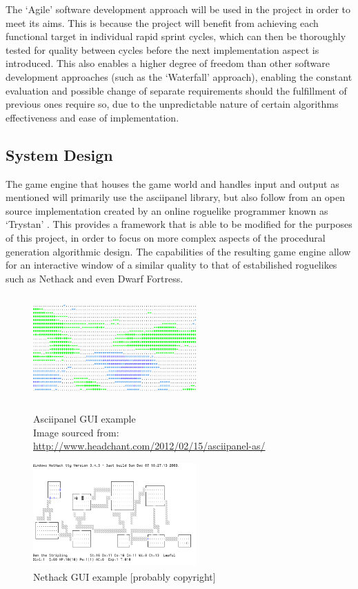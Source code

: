\documentclass[12pt,a4paper]{article}
\begin{document}
The `Agile' software development approach will be used in the project in order to meet its aims. This is because the project will benefit from achieving each functional target in individual rapid sprint cycles, which can then be thoroughly tested for quality between cycles before the next implementation aspect is introduced. This also enables a higher degree of freedom than other software development approaches (such as the `Waterfall' approach), enabling the constant evaluation and possible change of separate requirements should the fulfillment of previous ones require so, due to the unpredictable nature of certain algorithms effectiveness and ease of implementation.


\subsection{System Design}

The game engine that houses the game world and handles input and output as mentioned will primarily use the asciipanel library, but also follow from an open source implementation created by an online roguelike programmer known as `Trystan' \cite{trystan}. This provides a framework that is able to be modified for the purposes of this project, in order to focus on more complex aspects of the procedural generation algorithmic design. The capabilities of the resulting game engine allow for an interactive window of a similar quality to that of estabilished roguelikes such as Nethack and even Dwarf Fortress. 


\begin{figure}[h]
\begin{minipage}{.5\textwidth}
  \centering
 	\includegraphics[width=6.25cm,height=4cm]{images/asciipanel1inv.png}
	\caption[]{Asciipanel GUI example \\ Image sourced from: \\\url{http://www.headchant.com/2012/02/15/asciipanel-as/}}
	\label{fig:fig1}
\end{minipage}
\begin{minipage}{.5\textwidth}
  \centering
  \includegraphics[width=6.25cm, height=4cm]{images/nethack2.png}
  \caption[]{Nethack GUI example [probably copyright]}
  \label{fig:fig2}
\end{minipage}
\end{figure}
\end{document}
